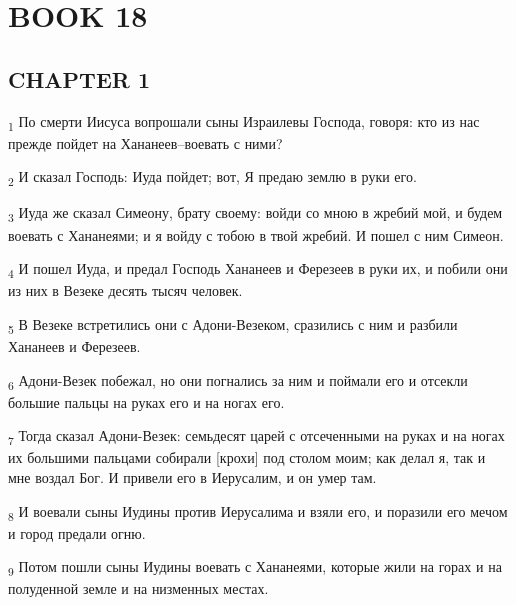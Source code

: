 \section{BOOK 18}
\subsection{CHAPTER 1}
\begin{tcolorbox}
\textsubscript{1} По смерти Иисуса вопрошали сыны Израилевы Господа, говоря: кто из нас прежде пойдет на Хананеев--воевать с ними?
\end{tcolorbox}
\begin{tcolorbox}
\textsubscript{2} И сказал Господь: Иуда пойдет; вот, Я предаю землю в руки его.
\end{tcolorbox}
\begin{tcolorbox}
\textsubscript{3} Иуда же сказал Симеону, брату своему: войди со мною в жребий мой, и будем воевать с Хананеями; и я войду с тобою в твой жребий. И пошел с ним Симеон.
\end{tcolorbox}
\begin{tcolorbox}
\textsubscript{4} И пошел Иуда, и предал Господь Хананеев и Ферезеев в руки их, и побили они из них в Везеке десять тысяч человек.
\end{tcolorbox}
\begin{tcolorbox}
\textsubscript{5} В Везеке встретились они с Адони-Везеком, сразились с ним и разбили Хананеев и Ферезеев.
\end{tcolorbox}
\begin{tcolorbox}
\textsubscript{6} Адони-Везек побежал, но они погнались за ним и поймали его и отсекли большие пальцы на руках его и на ногах его.
\end{tcolorbox}
\begin{tcolorbox}
\textsubscript{7} Тогда сказал Адони-Везек: семьдесят царей с отсеченными на руках и на ногах их большими пальцами собирали [крохи] под столом моим; как делал я, так и мне воздал Бог. И привели его в Иерусалим, и он умер там.
\end{tcolorbox}
\begin{tcolorbox}
\textsubscript{8} И воевали сыны Иудины против Иерусалима и взяли его, и поразили его мечом и город предали огню.
\end{tcolorbox}
\begin{tcolorbox}
\textsubscript{9} Потом пошли сыны Иудины воевать с Хананеями, которые жили на горах и на полуденной земле и на низменных местах.
\end{tcolorbox}
